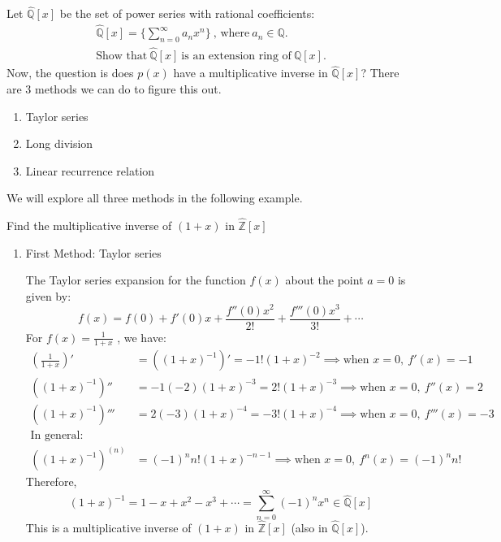 \begin{example}\label{example:rings:powerSeriesRing}
Let $\widehat{{\mathbb Q}}[x]$ be the set of power series with rational coefficients:
\begin{align*}
\widehat{{\mathbb Q}}[x]=\{\sum_{n=0}^{\infty}a_n x^n\}~\text{, where}~a_n\in {\mathbb Q}.\\  
\text{Show that}~ \widehat{{\mathbb Q}}[x]~\text{is an extension ring of}~{\mathbb Q}[x].
\end{align*}
Now, the question is does $p(x)$ have a multiplicative inverse in $\widehat{{\mathbb Q}}[x]$? There are 3 methods we can do to figure this out.
\begin{enumerate}
\item Taylor series
\item Long division
\item Linear recurrence relation
\end{enumerate}

We will explore all three methods in the following example.

\begin{example}\label{example:rings:Zx}
Find the multiplicative inverse of $(1+x)$ in $\widehat{{\mathbb Z}}[x]$\\

\begin{enumerate}
\item First Method: Taylor series

The Taylor series expansion for the function $f(x)$ about the point $a=0$ is given by:
\begin{equation*}{}
f(x)=f(0)+f'(0)x+\frac{f''(0)x^2}{2!}+\frac{f'''(0)x^3}{3!}+\cdots
\end{equation*}
For $f(x)=\frac{1}{1+x}$ , we have:
\begin{align*}
\left(\frac{1}{1+x}\right)'&=((1+x)^{-1})'=-1!(1+x)^{-2}\implies \text{when $x=0,~f'(x)=-1$}\\
((1+x)^{-1})''&=-1(-2)(1+x)^{-3}=2!(1+x)^{-3}\implies \text{when $x=0,~f''(x)=2$}\\
((1+x)^{-1})'''&=2(-3)(1+x)^{-4}=-3!(1+x)^{-4} \implies \text{when $x=0,~f'''(x)=-3$}\\
\text{In general:} \\
((1+x)^{-1})^{(n)}&=(-1)^{n}n!(1+x)^{-n-1} \implies \text{when $x=0,~f^n(x)=(-1)^{n}n!$}
\end{align*}
Therefore,
\begin{equation}
(1+x)^{-1}=1-x+x^2-x^3+\cdots=\sum_{n=0}^{\infty}(-1)^nx^n\in \widehat{{\mathbb Q}}[x]
\end{equation}
This is a multiplicative inverse of $(1+x)$ in $\widehat{{\mathbb Z}}[x]$ (also in $\widehat{{\mathbb Q}}[x]$).


\end{enumerate}
\end{example}
\end{example}
